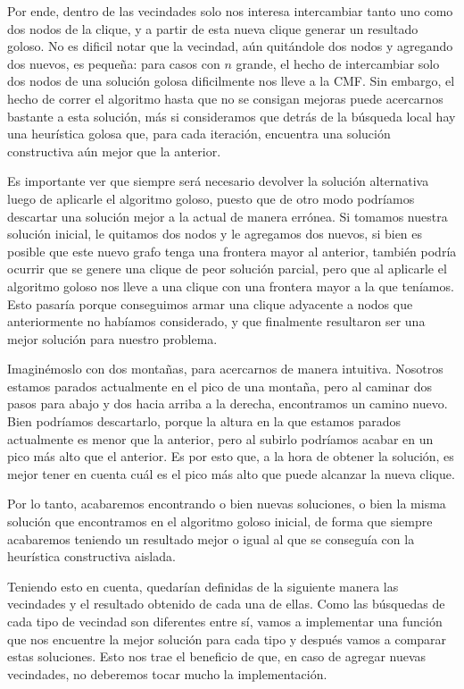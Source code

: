 Por ende, dentro de las vecindades solo nos interesa intercambiar tanto uno como dos nodos de la clique, y a partir de esta nueva clique generar un resultado goloso. No es dificil notar que la vecindad, aún quitándole dos nodos y agregando dos nuevos, es pequeña: para casos con $n$ grande, el hecho de intercambiar solo dos nodos de una solución golosa dificilmente nos lleve a la CMF. Sin embargo, el hecho de correr el algoritmo hasta que no se consigan mejoras puede acercarnos bastante a esta solución, más si consideramos que detrás de la búsqueda local hay una heurística golosa que, para cada iteración, encuentra una solución constructiva aún mejor que la anterior.

Es importante ver que siempre será necesario devolver la solución alternativa luego de aplicarle el algoritmo goloso, puesto que de otro modo podríamos descartar una solución mejor a la actual de manera errónea. Si tomamos nuestra solución inicial, le quitamos dos nodos y le agregamos dos nuevos, si bien es posible que este nuevo grafo tenga una frontera mayor al anterior, también podría ocurrir que se genere una clique de peor solución parcial, pero que al aplicarle el algoritmo goloso nos lleve a una clique con una frontera mayor a la que teníamos. Esto pasaría porque conseguimos armar una clique adyacente a nodos que anteriormente no habíamos considerado, y que finalmente resultaron ser una mejor solución para nuestro problema.

Imaginémoslo con dos montañas, para acercarnos de manera intuitiva. Nosotros estamos parados actualmente en el pico de una montaña, pero al caminar dos pasos para abajo y dos hacia arriba a la derecha, encontramos un camino nuevo. Bien podríamos descartarlo, porque la altura en la que estamos parados actualmente es menor que la anterior, pero al subirlo podríamos acabar en un pico más alto que el anterior. Es por esto que, a la hora de obtener la solución, es mejor tener en cuenta cuál es el pico más alto que puede alcanzar la nueva clique.

Por lo tanto, acabaremos encontrando o bien nuevas soluciones, o bien la misma solución que encontramos en el algoritmo goloso inicial, de forma que siempre acabaremos teniendo un resultado mejor o igual al que se conseguía con la heurística constructiva aislada.

Teniendo esto en cuenta, quedarían definidas de la siguiente manera las vecindades y el resultado obtenido de cada una de ellas. Como las búsquedas de cada tipo de vecindad son diferentes entre sí, vamos a implementar una función que nos encuentre la mejor solución para cada tipo y después vamos a comparar estas soluciones. Esto nos trae el beneficio de que, en caso de agregar nuevas vecindades, no deberemos tocar mucho la implementación.

